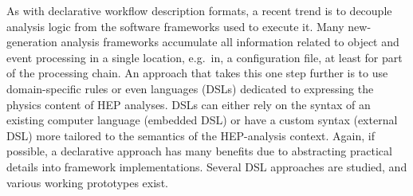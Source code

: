 \documentclass[11pt]{article}
\begin{document}
As with declarative workflow description formats, a recent trend is to decouple analysis logic from the software frameworks used to execute it. Many new-generation analysis frameworks accumulate all information related to object and event processing in a single location, e.g.~in, a configuration file, at least for part of the processing chain. An approach that takes this one step further is to use domain-specific rules or even languages (DSLs) dedicated to expressing the physics content of HEP analyses. DSLs can either rely on the syntax of an existing computer language (embedded DSL) or have a custom syntax (external DSL) more tailored to the semantics of the HEP-analysis context. Again, if possible, a declarative approach has many benefits due to abstracting practical details into framework implementations. Several DSL approaches are studied, and various working prototypes exist. 







\end{document}

